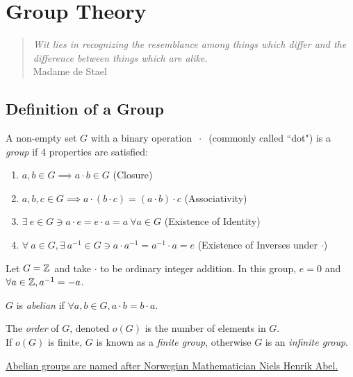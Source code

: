 \chapter{Group Theory}
\begin{quote}
    \textit{Wit lies in recognizing the resemblance among things which differ and the difference
    between things which are alike.}\\

Madame de Stael
\end{quote}
\section{Definition of a Group}
\begin{definition}[Group]
A non-empty set $G$ with a binary operation $\ \cdot \ $ (commonly called ``dot") is a
\textit{group} if 4 properties are satisfied:
\begin{enumerate}
    \item $a,b\in G \implies a\cdot b \in G$ (Closure)
    \item $a,b,c\in G\implies a\cdot(b\cdot c)=(a\cdot b)\cdot c$ (Associativity)
    \item $\exists \ e \in G\ni a\cdot e=e\cdot a=a \ \forall a \in G$ (Existence of Identity)
    \item $\forall \ a\in G, \exists \ a^{-1}\in G\ni a\cdot a^{-1}=a^{-1}\cdot a = e$ (Existence of
    Inverses under $\cdot$)
\end{enumerate}
\end{definition}

\begin{example}
Let $G={\mathbb{Z}}$ and take $\cdot$ to be ordinary integer addition. In this group, $e=0$ and
$\forall a \in {\mathbb{Z}}, a^{-1}=-a$.
\end{example}
\begin{definition}
$G$ is \textit{abelian} if $\forall a,b\in G, a\cdot b= b\cdot a$.
\end{definition}
\begin{definition}
The \textit{order} of $G$, denoted $o(G)$ is the number of elements in $G$. \\ If $o(G)$ is finite,
$G$ is known as a \textit{finite group}, otherwise $G$ is an \textit{infinite group}.
\end{definition}
\href{https://en.wikipedia.org/wiki/Niels_Henrik_Abel}{Abelian groups are named after Norwegian Mathematician Niels Henrik Abel.}
